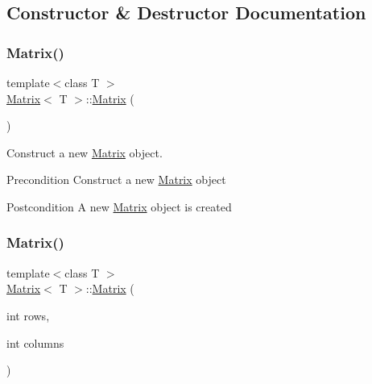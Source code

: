 \subsection{Constructor \& Destructor Documentation}
\mbox{\label{class_matrix_a9d567e3a121b1be0c3f9c461cab524fe}} 
\subsubsection{\texorpdfstring{Matrix()}{Matrix()}\hspace{0.1cm}{\footnotesize\ttfamily [1/3]}}
{\footnotesize\ttfamily template$<$class T $>$ \\
\mbox{\hyperlink{class_matrix}{Matrix}}$<$ T $>$\+::\mbox{\hyperlink{class_matrix}{Matrix}} (\begin{DoxyParamCaption}{ }\end{DoxyParamCaption})}



Construct a new \mbox{\hyperlink{class_matrix}{Matrix}} object. 

\begin{DoxyPrecond}{Precondition}
Construct a new \mbox{\hyperlink{class_matrix}{Matrix}} object 
\end{DoxyPrecond}
\begin{DoxyPostcond}{Postcondition}
A new \mbox{\hyperlink{class_matrix}{Matrix}} object is created 
\end{DoxyPostcond}
\mbox{\label{class_matrix_a44eb4cf3a243fe027112d1ace474ead9}} 
\subsubsection{\texorpdfstring{Matrix()}{Matrix()}\hspace{0.1cm}{\footnotesize\ttfamily [2/3]}}
{\footnotesize\ttfamily template$<$class T $>$ \\
\mbox{\hyperlink{class_matrix}{Matrix}}$<$ T $>$\+::\mbox{\hyperlink{class_matrix}{Matrix}} (\begin{DoxyParamCaption}\item[{int}]{rows,  }\item[{int}]{columns }\end{DoxyParamCaption})}



